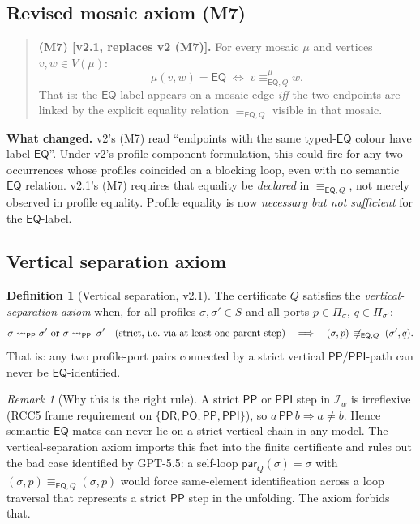 \documentclass[11pt]{article}
\theoremstyle{definition}
\newtheorem{definition}[theorem]{Definition}
\theoremstyle{remark}
\newtheorem{remark}[theorem]{Remark}
\newcommand{\DR}{\mathsf{DR}}
\newcommand{\PO}{\mathsf{PO}}
\newcommand{\PP}{\mathsf{PP}}
\newcommand{\PPI}{\mathsf{PPI}}
\newcommand{\EQ}{\mathsf{EQ}}
\newcommand{\BaseEdge}{\{\DR,\PO,\PP,\PPI\}}
\newcommand{\eqQ}{\equiv_{\EQ,Q}}
\newcommand{\reach}{\rightsquigarrow}
\begin{document}
\subsection{Revised mosaic axiom (M7)}

\begin{quote}
\textbf{(M7) [v2.1, replaces v2 (M7)].}\;
For every mosaic $\mu$ and vertices $v,w \in V(\mu)$:
\[
\mu(v,w) = \EQ \;\Longleftrightarrow\; v \mathrel{\eqQ^\mu} w.
\]
That is: the $\EQ$-label appears on a mosaic edge \emph{iff} the
two endpoints are linked by the explicit equality relation $\eqQ$
visible in that mosaic.
\end{quote}

\noindent
\textbf{What changed.}\; v2's (M7) read ``endpoints with the same
typed-$\EQ$ colour have label $\EQ$''.  Under v2's profile-component
formulation, this could fire for any two occurrences whose profiles
coincided on a blocking loop, even with no semantic $\EQ$ relation.
v2.1's (M7) requires that equality be \emph{declared} in $\eqQ$,
not merely observed in profile equality.  Profile equality is now
\emph{necessary but not sufficient} for the $\EQ$-label.

\subsection{Vertical separation axiom}

\begin{definition}[Vertical separation, v2.1]\label{def:vert-sep}
The certificate $Q$ satisfies the \emph{vertical-separation axiom}
when, for all profiles $\sigma,\sigma'\in S$ and all ports
$p\in\Pi_\sigma$, $q\in\Pi_{\sigma'}$:
\[
\sigma\reach_{\PP}\sigma'\ \text{or}\ \sigma\reach_{\PPI}\sigma'
\quad\text{(strict, i.e.\ via at least one parent step)}
\quad\Longrightarrow\quad
(\sigma,p)\;\not\!\eqQ\;(\sigma',q).
\]
That is: any two profile-port pairs connected by a strict vertical
$\PP/\PPI$-path can never be $\EQ$-identified.
\end{definition}

\begin{remark}[Why this is the right rule]
A strict $\PP$ or $\PPI$ step in $\mathcal{I}_w$ is irreflexive
(RCC5 frame requirement on $\BaseEdge$), so $a\,\PP\,b\Rightarrow
a\ne b$.  Hence semantic $\EQ$-mates can never lie on a strict
vertical chain in any model.  The vertical-separation axiom imports
this fact into the finite certificate and rules out the bad case
identified by GPT-5.5: a self-loop $\mathsf{par}_Q(\sigma)=\sigma$
with $(\sigma,p)\eqQ(\sigma,p)$ would force same-element
identification across a loop traversal that represents a strict
$\PP$ step in the unfolding.  The axiom forbids that.
\end{remark}
\end{document}
